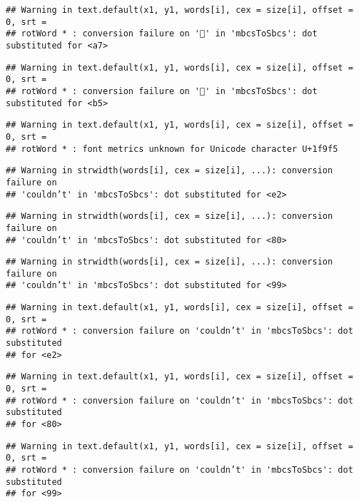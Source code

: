 \documentclass[
]{article}
\begin{document}
\begin{verbatim}
## Warning in text.default(x1, y1, words[i], cex = size[i], offset = 0, srt =
## rotWord * : conversion failure on '🧵' in 'mbcsToSbcs': dot substituted for <a7>
\end{verbatim}

\begin{verbatim}
## Warning in text.default(x1, y1, words[i], cex = size[i], offset = 0, srt =
## rotWord * : conversion failure on '🧵' in 'mbcsToSbcs': dot substituted for <b5>
\end{verbatim}

\begin{verbatim}
## Warning in text.default(x1, y1, words[i], cex = size[i], offset = 0, srt =
## rotWord * : font metrics unknown for Unicode character U+1f9f5
\end{verbatim}

\begin{verbatim}
## Warning in strwidth(words[i], cex = size[i], ...): conversion failure on
## 'couldn’t' in 'mbcsToSbcs': dot substituted for <e2>
\end{verbatim}

\begin{verbatim}
## Warning in strwidth(words[i], cex = size[i], ...): conversion failure on
## 'couldn’t' in 'mbcsToSbcs': dot substituted for <80>
\end{verbatim}

\begin{verbatim}
## Warning in strwidth(words[i], cex = size[i], ...): conversion failure on
## 'couldn’t' in 'mbcsToSbcs': dot substituted for <99>
\end{verbatim}

\begin{verbatim}
## Warning in text.default(x1, y1, words[i], cex = size[i], offset = 0, srt =
## rotWord * : conversion failure on 'couldn’t' in 'mbcsToSbcs': dot substituted
## for <e2>
\end{verbatim}

\begin{verbatim}
## Warning in text.default(x1, y1, words[i], cex = size[i], offset = 0, srt =
## rotWord * : conversion failure on 'couldn’t' in 'mbcsToSbcs': dot substituted
## for <80>
\end{verbatim}

\begin{verbatim}
## Warning in text.default(x1, y1, words[i], cex = size[i], offset = 0, srt =
## rotWord * : conversion failure on 'couldn’t' in 'mbcsToSbcs': dot substituted
## for <99>
\end{verbatim}
\end{document}
